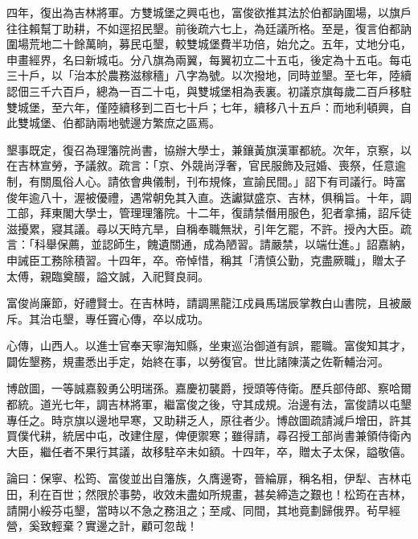 \begin{pinyinscope}
四年，復出為吉林將軍。方雙城堡之興屯也，富俊欲推其法於伯都訥圍場，以旗戶往往賴幫丁助耕，不如逕招民墾。前後疏六七上，為廷議所格。至是，復言伯都訥圍場荒地二十餘萬晌，募民屯墾，較雙城堡費半功倍，始允之。五年，丈地分屯，申畫經界，名曰新城屯。分八旗為兩翼，每翼初立二十五屯，後定為十五屯。每屯三十戶，以「治本於農務滋稼穡」八字為號。以次撥地，同時並墾。至七年，陸續認佃三千六百戶，總為一百二十屯，與雙城堡相為表裏。初議京旗每歲二百戶移駐雙城堡，至六年，僅陸續移到二百七十戶；七年，續移八十五戶：而地利頓興，自此雙城堡、伯都訥兩地號邊方繁庶之區焉。

墾事既定，復召為理籓院尚書，協辦大學士，兼鑲黃旗漢軍都統。次年，京察，以在吉林宣勞，予議敘。疏言：「京、外競尚浮奢，官民服飾及冠婚、喪祭，任意逾制，有關風俗人心。請依會典儀制，刊布規條，宣諭民間。」詔下有司議行。時富俊年逾八十，渥被優禮，遇常朝免其入直。迭讞獄盛京、吉林，俱稱旨。十年，調工部，拜東閣大學士，管理理籓院。十二年，復請禁僭用服色，犯者拿捕，詔斥徒滋擾累，寢其議。尋以天時亢旱，自稱奉職無狀，引年乞罷，不許。授內大臣。疏言：「科舉保薦，並認師生，餽遺關通，成為陋習。請嚴禁，以端仕進。」詔嘉納，申誡臣工務除積習。十四年，卒。帝悼惜，稱其「清慎公勤，克盡厥職」，贈太子太傅，親臨奠醊，謚文誠，入祀賢良祠。

富俊尚廉節，好禮賢士。在吉林時，請調黑龍江戍員馬瑞辰掌教白山書院，且被嚴斥。其治屯墾，專任竇心傳，卒以成功。

心傳，山西人。以進士官奉天寧海知縣，坐東巡治御道有誤，罷職。富俊知其才，闢佐墾務，規畫悉出手定，始終在事，以勞復官。世比諸陳潢之佐靳輔治河。

博啟圖，一等誠嘉毅勇公明瑞孫。嘉慶初襲爵，授頭等侍衛。歷兵部侍郎、察哈爾都統。道光七年，調吉林將軍，繼富俊之後，守其成規。治邊有法，富俊請以屯墾專任之。時京旗以邊地早寒，又助耕乏人，原往者少。博啟圖疏請減戶增田，許其買僕代耕，統居中屯，改建住屋，俾便禦寒；雖得請，尋召授工部尚書兼領侍衛內大臣，繼任者不果行其議，故移駐卒未如額。十四年，卒，贈太子太保，謚敬僖。

論曰：保寧、松筠、富俊並出自籓族，久膺邊寄，晉綸扉，稱名相，伊犁、吉林屯田，利在百世；然限於事勢，收效未盡如所規畫，甚矣締造之艱也！松筠在吉林，請開小綏芬屯墾，當時以不急之務沮之；至咸、同間，其地竟劃歸俄界。茍早經營，奚致輕棄？實邊之計，顧可忽哉！


\end{pinyinscope}